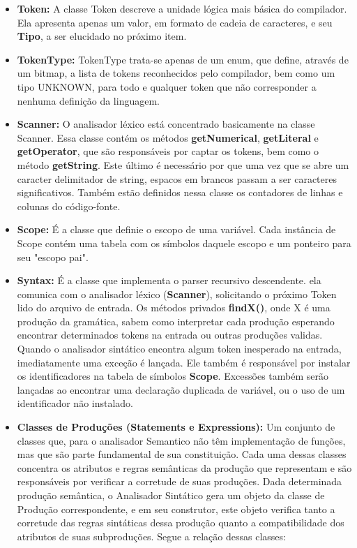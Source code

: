 \documentclass[11pt]{article}
\begin{document}
		
		\begin{itemize}
			
			\item \textbf{Token: }A classe Token descreve a unidade lógica mais básica do compilador. 
			Ela apresenta apenas um valor, em formato de cadeia de caracteres, e seu \textbf{Tipo}, 
			a ser elucidado no próximo item. 
			
			\item \textbf{TokenType: } TokenType trata-se apenas de um enum, que define, 
			através de um bitmap, a lista de tokens reconhecidos pelo compilador, bem como um tipo UNKNOWN, 
			para todo e qualquer token que não corresponder a nenhuma definição da linguagem.
			
			\item \textbf{Scanner: } O analisador léxico está concentrado basicamente na classe Scanner. 
			Essa classe contém os métodos \textbf{getNumerical}, \textbf{getLiteral} e \textbf{getOperator}, 
			que são responsáveis por captar os tokens, bem como o método \textbf{getString}. 
			Este último é necessário por que uma vez que se abre um caracter delimitador de string, 
			espacos em brancos passam a ser caracteres significativos. 
			Também estão definidos nessa classe os contadores de linhas e colunas do código-fonte.
			
			\item \textbf{Scope: } É a classe que definie o escopo de uma variável. 
			Cada instância de Scope contém uma tabela com os símbolos daquele escopo e um ponteiro para seu "escopo pai".
			
			\item \textbf{Syntax: } É a classe que implementa o parser recursivo descendente. 
			ela comunica com o analisador léxico (\textbf{Scanner}), solicitando o próximo Token lido do arquivo de entrada.
			Os métodos privados \textbf{findX()}, onde X é uma produção da gramática, sabem como interpretar cada produção
			esperando encontrar determinados tokens na entrada ou outras produções validas. Quando o analisador sintático 
			encontra algum token inesperado na entrada, imediatamente uma exceção é lançada. 
			Ele também é responsável por instalar os identificadores na tabela de símbolos \textbf{Scope}. 
			Excessões também serão lançadas  ao encontrar uma declaração duplicada de variável, ou o uso de um identificador
			não instalado. 
			
			\item \textbf{Classes de Produções (Statements e Expressions): } Um conjunto de classes que, para o analisador Semantico não têm implementação de funções, mas que são parte fundamental de sua constituição. Cada uma dessas classes concentra os atributos e regras semânticas da produção que representam e são responsáveis por verificar a corretude de suas produções. Dada determinada produção semântica, o Analisador Sintático gera um objeto da classe de Produção correspondente, e em seu construtor, este objeto verifica tanto a corretude das regras sintáticas dessa produção quanto a compatibilidade dos atributos de suas subproduções. Segue a relação dessas classes:
			

\end{itemize}
\end{document}
